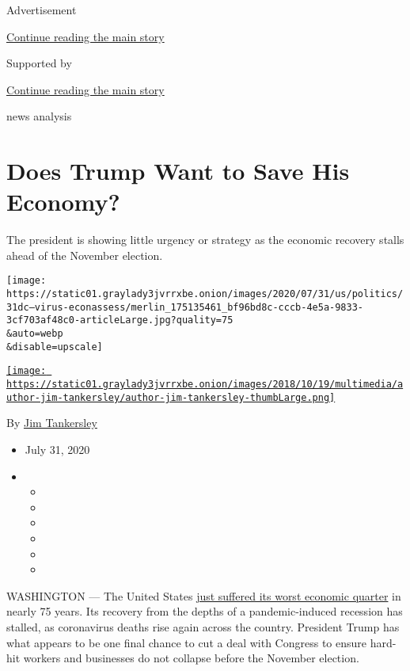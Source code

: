 Advertisement

\protect\hyperlink{after-top}{Continue reading the main story}

Supported by

\protect\hyperlink{after-sponsor}{Continue reading the main story}

news analysis

\hypertarget{does-trump-want-to-save-his-economy}{%
\section{Does Trump Want to Save His
Economy?}\label{does-trump-want-to-save-his-economy}}

The president is showing little urgency or strategy as the economic
recovery stalls ahead of the November election.

\texttt{[image: https://static01.graylady3jvrrxbe.onion/images/2020/07/31/us/politics/31dc--virus-econassess/merlin\_175135461\_bf96bd8c-cccb-4e5a-9833-3cf703af48c0-articleLarge.jpg?quality=75\\\&auto=webp\\\&disable=upscale]}

\href{https://www.nytimes3xbfgragh.onion/by/jim-tankersley}{\texttt{[image: https://static01.graylady3jvrrxbe.onion/images/2018/10/19/multimedia/author-jim-tankersley/author-jim-tankersley-thumbLarge.png]}}

By \href{https://www.nytimes3xbfgragh.onion/by/jim-tankersley}{Jim
Tankersley}

\begin{itemize}
\item
  July 31, 2020
\item
  \begin{itemize}
  \item
  \item
  \item
  \item
  \item
  \item
  \end{itemize}
\end{itemize}

WASHINGTON --- The United States
\href{https://www.nytimes3xbfgragh.onion/2020/07/30/business/economy/q2-gdp-coronavirus-economy.html}{just
suffered its worst economic quarter} in nearly 75 years. Its recovery
from the depths of a pandemic-induced recession has stalled, as
coronavirus deaths rise again across the country. President Trump has
what appears to be one final chance to cut a deal with Congress to
ensure hard-hit workers and businesses do not collapse before the
November election.

